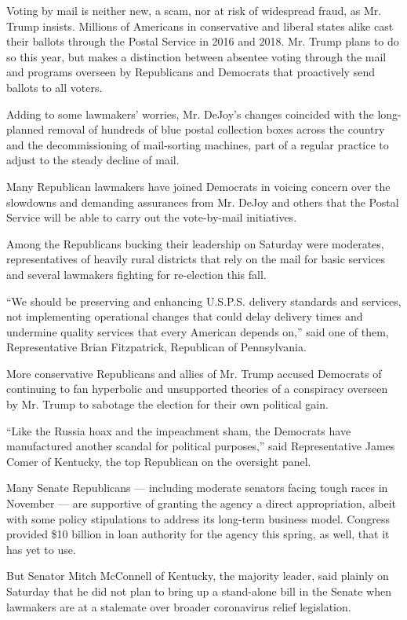 Voting by mail is neither new, a scam, nor at risk of widespread fraud,
as Mr. Trump insists. Millions of Americans in conservative and liberal
states alike cast their ballots through the Postal Service in 2016 and
2018. Mr. Trump plans to do so this year, but makes a distinction
between absentee voting through the mail and programs overseen by
Republicans and Democrats that proactively send ballots to all voters.

Adding to some lawmakers' worries, Mr. DeJoy's changes coincided with
the long-planned removal of hundreds of blue postal collection boxes
across the country and the decommissioning of mail-sorting machines,
part of a regular practice to adjust to the steady decline of mail.

Many Republican lawmakers have joined Democrats in voicing concern over
the slowdowns and demanding assurances from Mr. DeJoy and others that
the Postal Service will be able to carry out the vote-by-mail
initiatives.

Among the Republicans bucking their leadership on Saturday were
moderates, representatives of heavily rural districts that rely on the
mail for basic services and several lawmakers fighting for re-election
this fall.

``We should be preserving and enhancing U.S.P.S. delivery standards and
services, not implementing operational changes that could delay delivery
times and undermine quality services that every American depends on,''
said one of them, Representative Brian Fitzpatrick, Republican of
Pennsylvania.

More conservative Republicans and allies of Mr. Trump accused Democrats
of continuing to fan hyperbolic and unsupported theories of a conspiracy
overseen by Mr. Trump to sabotage the election for their own political
gain.

``Like the Russia hoax and the impeachment sham, the Democrats have
manufactured another scandal for political purposes,'' said
Representative James Comer of Kentucky, the top Republican on the
oversight panel.

Many Senate Republicans --- including moderate senators facing tough
races in November --- are supportive of granting the agency a direct
appropriation, albeit with some policy stipulations to address its
long-term business model. Congress provided \$10 billion in loan
authority for the agency this spring, as well, that it has yet to use.

But Senator Mitch McConnell of Kentucky, the majority leader, said
plainly on Saturday that he did not plan to bring up a stand-alone bill
in the Senate when lawmakers are at a stalemate over broader coronavirus
relief legislation.


